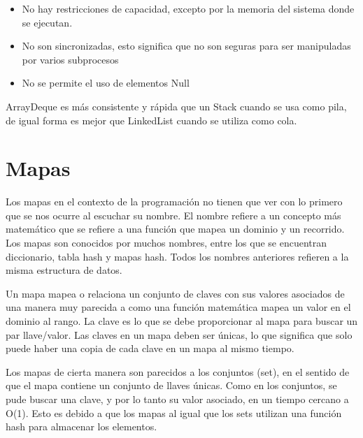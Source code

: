 \documentclass[11pt]{article}
\begin{document}
\begin{itemize}

\item No hay restricciones de capacidad, excepto por la memoria del 
sistema donde se ejecutan.

\item No son sincronizadas, esto significa que no son seguras para 
ser manipuladas por varios subprocesos

\item No se permite el uso de elementos Null

\end{itemize}

ArrayDeque es más consistente y rápida que un Stack cuando se usa 
como pila, de igual forma es mejor que LinkedList cuando se utiliza 
como cola.

\section{Mapas}

\par

Los mapas en el contexto de la programación no tienen que ver con lo 
primero que se nos ocurre al escuchar su nombre. El nombre refiere a 
un concepto más matemático que se refiere a una función que mapea un 
dominio y un recorrido. Los mapas son conocidos por muchos nombres, 
entre los que se encuentran diccionario, tabla hash y mapas hash. 
Todos los nombres anteriores refieren a la misma estructura de datos.

\par

Un mapa mapea o relaciona un conjunto de claves con sus valores 
asociados de una manera muy parecida a como una función matemática 
mapea un valor en el dominio al rango. La clave es lo que se debe 
proporcionar al mapa para buscar un par llave/valor. Las claves en un 
mapa deben ser únicas, lo que significa que solo puede haber una 
copia de cada clave en un mapa al mismo tiempo. 

\par

Los mapas de cierta manera son parecidos a los conjuntos (set), en el 
sentido de que el mapa contiene un conjunto de llaves únicas. Como en 
los conjuntos, se pude buscar una clave, y por lo tanto su valor 
asociado, en un tiempo cercano a O(1). Esto es debido a que los mapas 
al igual que los sets utilizan una función hash para almacenar los 
elementos.
\end{document}
